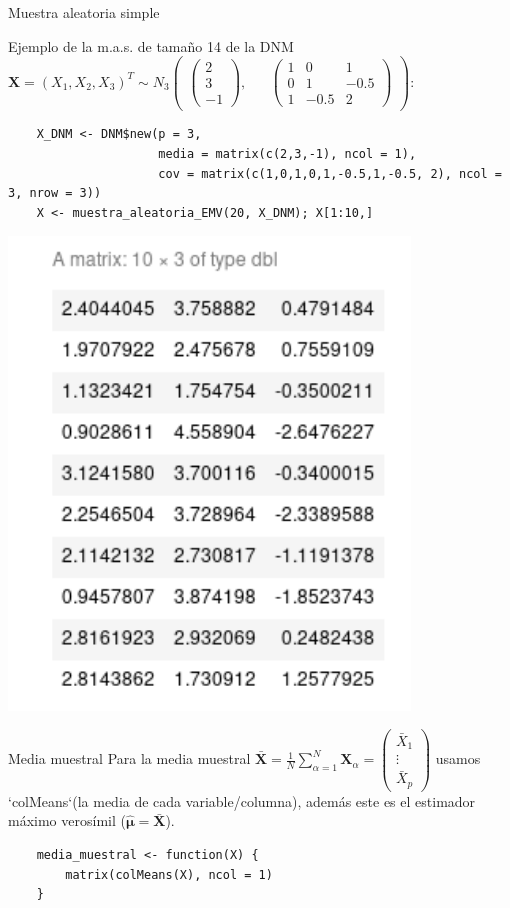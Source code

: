 \documentclass[xcolor=table]{beamer}
\begin{document}
\begin{frame}[fragile]{Muestra aleatoria simple}

Ejemplo de la m.a.s. de tamaño 14 de la DNM $\pmb{X} = (X_1, X_2, X_3)^T \sim N_3 \begin{pmatrix} \begin{pmatrix} 2 \\ 3 \\ -1 \end{pmatrix}, && \begin{pmatrix} 1 & 0 & 1 \\ 0 & 1 & -0.5 \\ 1 & -0.5 & 2 \end{pmatrix} \end{pmatrix} $:

	\begin{lstlisting}
	X_DNM <- DNM$new(p = 3,
					 media = matrix(c(2,3,-1), ncol = 1),
					 cov = matrix(c(1,0,1,0,1,-0.5,1,-0.5, 2), ncol = 3, nrow = 3))
	X <- muestra_aleatoria_EMV(20, X_DNM); X[1:10,]
	\end{lstlisting}

\includegraphics[width=0.8\textwidth]{mas.png}

\end{frame}

\begin{frame}[fragile]{Media muestral}
Para la media muestral $\pmb{\bar{X}} = \frac{1}{N} \sum^N_{\alpha = 1} \pmb{X}_\alpha = \begin{pmatrix} \bar{X}_1 \\ \vdots \\ \bar{X}_p \end{pmatrix}$ usamos `colMeans`(la media de cada variable/columna), además este es el estimador máximo verosímil ($\pmb{\hat{\mu}} = \pmb{\bar{X}}$).

	\begin{lstlisting}
	media_muestral <- function(X) {
    	matrix(colMeans(X), ncol = 1)
	}
	\end{lstlisting}

\end{frame}
\end{document}
